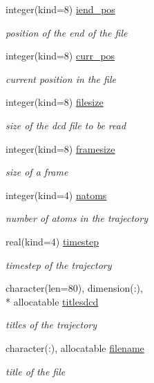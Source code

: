 \begin{DoxyCompactItemize}
integer(kind=8) \hyperlink{structdcdmod_1_1dcdinfo__t_a7418326b53ddd20d067949c817b3b03d}{iend\-\_\-pos}
\begin{DoxyCompactList}\small\item\em position of the end of the file \end{DoxyCompactList}\item 
integer(kind=8) \hyperlink{structdcdmod_1_1dcdinfo__t_aea02e6390d9b31e54095730d994b249f}{curr\-\_\-pos}
\begin{DoxyCompactList}\small\item\em current position in the file \end{DoxyCompactList}\item 
integer(kind=8) \hyperlink{structdcdmod_1_1dcdinfo__t_a46621c35e11573a47ddc4e9633192322}{filesize}
\begin{DoxyCompactList}\small\item\em size of the dcd file to be read \end{DoxyCompactList}\item 
integer(kind=8) \hyperlink{structdcdmod_1_1dcdinfo__t_a605b9b04ee4d7576c261a19c9d6ed54d}{framesize}
\begin{DoxyCompactList}\small\item\em size of a frame \end{DoxyCompactList}\item 
integer(kind=4) \hyperlink{structdcdmod_1_1dcdinfo__t_a49fecacd96f7fad5558ee7f16a81b4d8}{natoms}
\begin{DoxyCompactList}\small\item\em number of atoms in the trajectory \end{DoxyCompactList}\item 
real(kind=4) \hyperlink{structdcdmod_1_1dcdinfo__t_a02d43fa6b812b5613e723f119d48887d}{timestep}
\begin{DoxyCompactList}\small\item\em timestep of the trajectory \end{DoxyCompactList}\item 
character(len=80), dimension(\-:), \\*
allocatable \hyperlink{structdcdmod_1_1dcdinfo__t_a520fe3a7b3b6f96d0c0c0221a92f521a}{titlesdcd}
\begin{DoxyCompactList}\small\item\em titles of the trajectory \end{DoxyCompactList}\item 
character(\-:), allocatable \hyperlink{structdcdmod_1_1dcdinfo__t_a2fc640f68774b801c8390ee12830a410}{filename}
\begin{DoxyCompactList}\small\item\em title of the file \end{DoxyCompactList}\end{DoxyCompactItemize}


